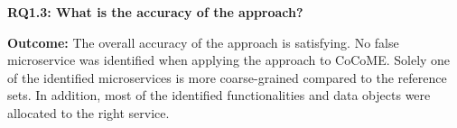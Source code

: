 \endgroup
\vspace{0.5cm}

\vspace{0.5cm}
\par
\begingroup

\noindent
\textbf{RQ1.3: What is the accuracy of the approach? }

\vspace{0.3cm}
\noindent
\textbf{Outcome:} The overall accuracy of the approach is satisfying. No false microservice was identified when applying the approach to CoCoME. Solely one of the identified microservices is more coarse-grained compared to the reference sets. In addition, most of the identified functionalities and data objects were allocated to the right service. 

\endgroup
\vspace{0.5cm}


